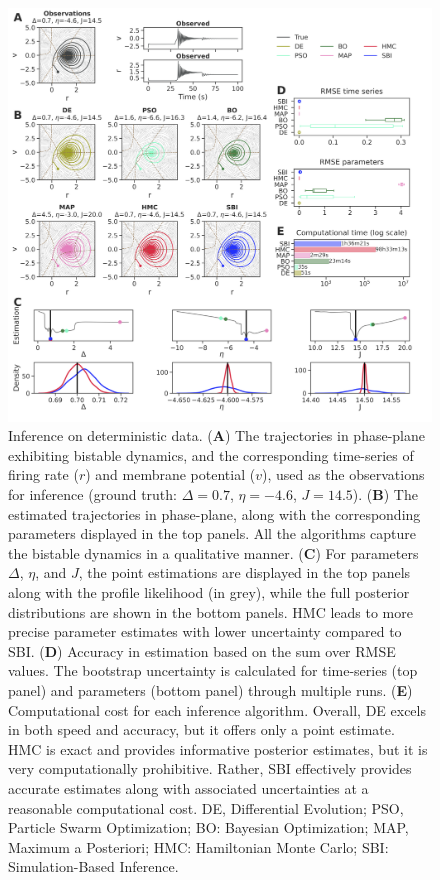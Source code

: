 \documentclass[preprint,11pt,authoryear]{elsarticle}
\begin{document}
\begin{figure}[p]
    \centering
    \includegraphics[width=\linewidth]{Figs/Fig1.png}
    \caption{Inference on deterministic data.  
     (\textbf{A}) The trajectories in phase-plane exhibiting bistable dynamics, and the corresponding time-series of firing rate ($r$) and membrane potential ($v$), used as the observations for inference (ground truth: $\Delta=0.7$, $\eta=-4.6$, $J=14.5$). (\textbf{B}) The estimated trajectories in phase-plane, along with the corresponding parameters displayed in the top panels. All the algorithms capture the bistable dynamics in a qualitative manner. (\textbf{C}) For parameters $\Delta$, $\eta$, and $J$, the point estimations are displayed in the top panels along with the profile likelihood (in grey), while the full posterior distributions are shown in the bottom panels. HMC leads to more precise parameter estimates with lower uncertainty compared to SBI.  (\textbf{D}) Accuracy in estimation based on the sum over RMSE values. The bootstrap uncertainty is calculated for time-series (top panel) and parameters (bottom panel) through multiple runs. (\textbf{E}) Computational cost for each inference algorithm.  Overall, DE excels in both speed and accuracy, but it offers only a point estimate. HMC is exact and provides informative posterior estimates, but it is very computationally prohibitive. Rather, SBI effectively provides accurate estimates along with associated uncertainties at a reasonable computational cost. DE, Differential Evolution; PSO, Particle Swarm Optimization; BO: Bayesian Optimization; MAP, Maximum a Posteriori; HMC: Hamiltonian Monte Carlo;  SBI: Simulation-Based Inference.
    } 
    \label{fig:ODEdata}
\end{figure}
\end{document}

